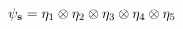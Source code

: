 \begin{equation}
 \psi_{\bf s}
  = \eta_1 \otimes \eta_2 \otimes\eta_3 \otimes \eta_4 \otimes \eta_5
\end{equation}

